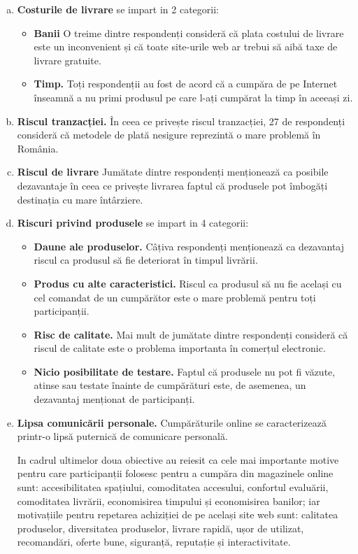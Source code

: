 \documentclass[a4paper, 12pt]{article}
\begin{document}
	\begin{enumerate}[a.]
		\item \textbf {Costurile de livrare} se impart in 2 categorii:
	\begin{itemize}
		\item\textbf{Banii} O treime dintre respondenți consideră că plata costului de livrare este un inconvenient și că toate site-urile web ar trebui să aibă taxe de livrare gratuite.
		\item\textbf{Timp.} Toți respondenții au fost de acord că a cumpăra de pe Internet înseamnă a nu primi produsul pe care l-ați cumpărat la timp în aceeași zi.
	\end{itemize}
	\item\textbf{Riscul tranzacției.} În ceea ce privește riscul tranzacției, 27 de respondenți consideră că metodele de plată nesigure reprezintă o mare problemă în România.
	\item\textbf {Riscul de livrare}
		Jumătate dintre respondenți menționează ca posibile dezavantaje în ceea ce privește livrarea faptul că produsele pot îmbogăți destinația cu mare întârziere.
	\item\textbf{Riscuri privind produsele} se impart in 4 categorii:
	\begin{itemize}
	\item \textbf{Daune ale produselor.} Câțiva respondenți menționează ca dezavantaj riscul ca produsul să fie deteriorat în timpul livrării.
	\item\textbf{Produs cu alte caracteristici.} Riscul ca produsul să nu fie același cu cel comandat de un cumpărător este o mare problemă pentru toți participanții.
	\item\textbf{Risc de calitate.} Mai mult de jumătate dintre respondenți consideră că riscul de calitate este o problema importanta în comerțul electronic.
	\item\textbf{Nicio posibilitate de testare.} Faptul că produsele nu pot fi văzute, atinse sau testate înainte de cumpărături este, de asemenea, un dezavantaj menționat de participanți.
	\end{itemize}
	\item\textbf{Lipsa comunicării personale.}
		Cumpărăturile online se caracterizează printr-o lipsă puternică de comunicare personală.
		
		\quad In cadrul ultimelor doua obiective au reiesit ca cele mai importante motive pentru care participanții folosesc pentru a cumpăra din magazinele online sunt: accesibilitatea spațiului, comoditatea accesului, confortul evaluării, comoditatea livrării, economisirea timpului și economisirea banilor; iar motivațiile pentru repetarea achiziției de pe același site web sunt: calitatea produselor, diversitatea produselor, livrare rapidă, ușor de utilizat, recomandări, oferte bune, siguranță, reputație și interactivitate.
	\end{enumerate}
\end{document}

